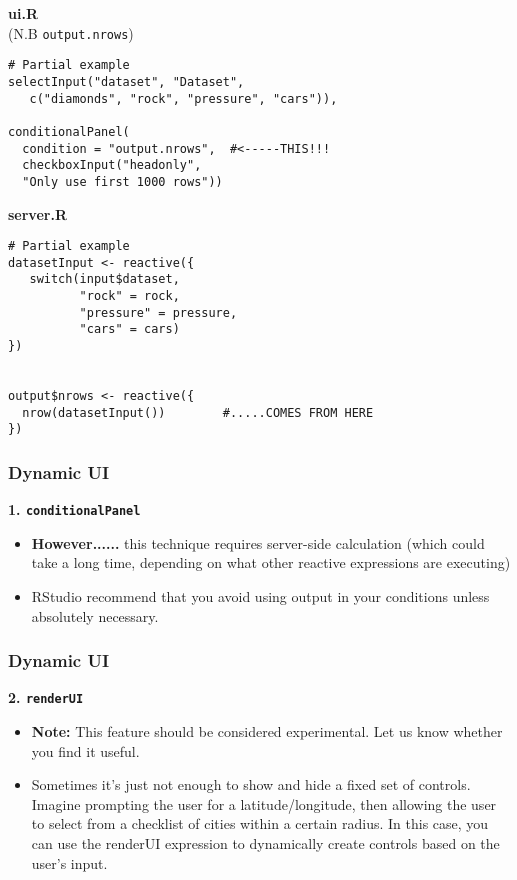 \documentclass{beamer}
\begin{document}
\begin{frame}[fragile]
\textbf{ui.R} \\
(N.B \texttt{output.nrows})

\begin{framed}
\begin{verbatim}
# Partial example
selectInput("dataset", "Dataset", 
   c("diamonds", "rock", "pressure", "cars")),
   
conditionalPanel(
  condition = "output.nrows",  #<-----THIS!!!
  checkboxInput("headonly", 
  "Only use first 1000 rows"))
\end{verbatim} 
\end{framed}
\end{frame}
\begin{frame}[fragile] 
\textbf{server.R}
\begin{framed}
\begin{verbatim}
# Partial example
datasetInput <- reactive({
   switch(input$dataset,
          "rock" = rock,
          "pressure" = pressure,
          "cars" = cars)
})


output$nrows <- reactive({
  nrow(datasetInput())        #.....COMES FROM HERE
})
\end{verbatim}
\end{framed}
\end{frame}
\begin{frame}
\frametitle{Dynamic UI}
\Large
\textbf{1. \texttt{conditionalPanel}}
\vspace{1cm}
\begin{itemize}
\item\textbf{However......} this technique requires server-side calculation (which could take a long time, depending on what other reactive expressions are executing) 
\item RStudio recommend that you avoid using output in your conditions unless absolutely necessary.
\end{itemize}
\end{frame}
\begin{frame}
\frametitle{Dynamic UI}
\Large
\textbf{2. \texttt{renderUI}}

\begin{itemize}
\item \textbf{Note:} This feature should be considered experimental. Let us know whether you find it useful.

\item Sometimes it’s just not enough to show and hide a fixed set of controls. Imagine prompting the user for a latitude/longitude, then allowing the user to select from a checklist of cities within a certain radius. In this case, you can use the renderUI expression to dynamically create controls based on the user’s input.
\end{itemize}
\end{frame}
\end{document}

